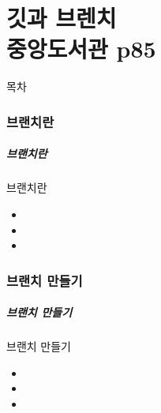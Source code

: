\documentclass[aspectratio=1610,20pt,xcolor=pdftex,dvipsnames,table,handout]{beamer}
\begin{document}
		\part{깃과 브렌치 \\ 중앙도서관 p85 }
		\frame{\partpage}
		
\label{part3} 	%

		\begin{frame} [plain]{목차}
		\tableofcontents%
		\end{frame}

		\section{ 브랜치란}

		\begin{frame} [t,plain]
		\frametitle{브랜치란 }
			\begin{block} {브랜치란 }
			\setlength{\leftmargini}{1em}			
			\begin{itemize}
				\item 	
				\item 	
				\item 	
			\end{itemize}
			\end{block}						
		\end{frame}						




		\section{ 브랜치 만들기}

		\begin{frame} [t,plain]
		\frametitle{브랜치 만들기 }
			\begin{block} {브랜치 만들기 }
			\setlength{\leftmargini}{1em}			
			\begin{itemize}
				\item 	
				\item 	
				\item 	
			\end{itemize}
			\end{block}						
		\end{frame}						
\end{document}
